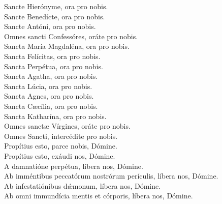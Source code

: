 {	Sancte Hierónyme, ora pro nobis. \\
	Sancte Benedícte, ora pro nobis. \\
	Sancte Antóni, ora pro nobis. \\
		Omnes sancti Confessóres, oráte pro nobis. \\
	Sancta María Magdaléna, ora pro nobis. \\
		Sancta Felícitas, ora pro nobis. \\
		Sancta Perpétua, ora pro nobis. \\
	Sancta Agatha, ora pro nobis. \\
	Sancta Lúcia, ora pro nobis. \\
	Sancta Agnes, ora pro nobis. \\
	Sancta Cæcília, ora pro nobis. \\
	Sancta Katharína, ora pro nobis. \\
		Omnes sanctæ Vírgines, oráte pro nobis. \\
		Omnes Sancti, intercédite pro nobis. \\
	Propítius esto, parce nobis, Dómine. \\
	Propítius esto, exáudi nos, Dómine. \\
		A damnatióne perpétua, líbera nos, Dómine. \\
		Ab imméntibus peccatórum nostrórum perículis, líbera nos, Dómine. \\
		Ab infestatiónibus dǽmonum, líbera nos, Dómine. \\
		Ab omni immundícia mentis et córporis, líbera nos, Dómine. \\
}
